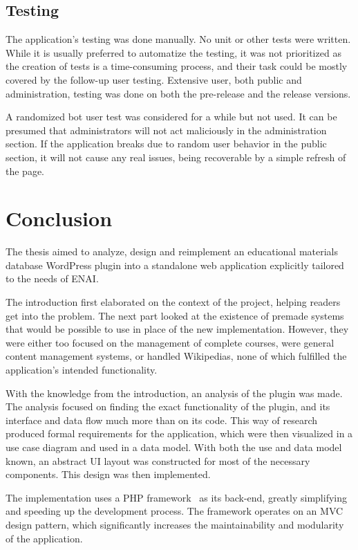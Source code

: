 \documentclass[
  digital,     %
  oneside,     %
  nosansbold,  %
  colorbold, %
  lof,         %
  lot,         %
]{fithesis4}
\begin{document}
\section{Testing}

The application's testing was done manually. No unit or other tests were written.
While it is usually preferred to automatize the testing, it was not prioritized as
the creation of tests is a time-consuming process, and their task could be mostly
covered by the follow-up user testing. Extensive user, both public and administration,
 testing was done on both the pre-release and the release versions.

A randomized bot user test was considered for a while but not used. It can be presumed
that administrators will not act maliciously in the administration section. If the application
breaks due to random user behavior in the public section, it will not cause any real
issues, being recoverable by a simple refresh of the page.

\chapter{Conclusion}

The thesis aimed to analyze, design and reimplement an educational materials database WordPress
plugin into a standalone web application explicitly tailored to the needs of ENAI.

The introduction first elaborated on the context of the project, helping readers get into the problem.
The next part looked at the existence of premade systems that would be possible to use in place of
the new implementation. However, they were either too focused on the management of complete
courses, were general content management systems, or handled Wikipedias, none of which fulfilled
the application's intended functionality.

With the knowledge from the introduction, an analysis of the plugin was made. The analysis focused
on finding the exact functionality of the plugin, and its interface and data flow much more than on its
code. This way of research produced formal requirements for the application, which were then
visualized in a use case diagram and used in a data model. With both the use and data model known,
an abstract UI layout was constructed for most of the necessary components. This design was then
implemented.

The implementation uses a PHP framework~\cite{codeigniter4} as its back-end, greatly simplifying and
speeding up the development process. The framework operates on an MVC design pattern, which
significantly increases the maintainability and modularity of the application.
\end{document}
